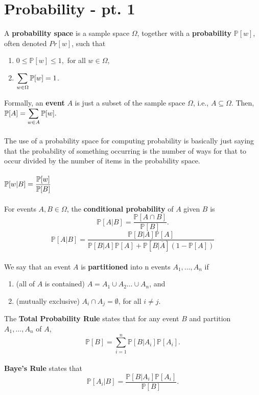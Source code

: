 \documentclass{article}
\theoremstyle{definition}
\begin{document}
\section*{Probability - pt. 1}
A \textbf{probability space} is a sample space $\Omega$, together with a \textbf{probability} $\mathbb{P}[w]$, often denoted $Pr[w]$, such that \begin{enumerate} \item $0 \leq \mathbb{P}[w] \leq 1,$ for all $w \in \Omega$,
\item $\mathlarger{\sum_{w \in \Omega} \mathbb{P}[w]} = 1$.
\end{enumerate} $ $ \\
Formally, an \textbf{event} $A$ is just a subset of the sample space $\Omega$, i.e., $A \subseteq \Omega$. Then, $\mathbb{P}[A] = \mathlarger{\sum_{w \in A}\mathbb{P}[w]}.$ \\ \\
The use of a probability space for computing probability is basically just saying that the probability of something occurring is the number of ways for that to occur divided by the number of items in the probability space. \\ \\
$\mathbb{P}[w | B] = \mathlarger{\frac{\mathbb{P}[w]}{\mathbb{P}[B]}}$ \\ \\
For events $A, B \in \Omega$, the \textbf{conditional probability} of $A$ given $B$ is $$\mathbb{P}[A | B] = \frac{\mathbb{P}[A \cap B]}{\mathbb{P}[B]}.$$
$$\mathbb{P}[A | B] = \frac{\mathbb{P}[B | A]\mathbb{P}[A]}{\mathbb{P}[B | A]\mathbb{P}[A] + \mathbb{P}[B | \overline{A}](1 - \mathbb{P}[A])}$$ \\
We say that an event $A$ is \textbf{partitioned} into n events $A_1, \dots, A_n$ if \begin{enumerate} \item (all of $A$ is contained) $A = A_1 \cup A_2 \dots \cup A_n$, and 
\item (mutually exclusive) $A_i \cap A_j = \emptyset$, for all $i \neq j.$
\end{enumerate} $ $ \\
The \textbf{Total Probability Rule} states that for any event $B$ and partition $A_1, \dots, A_n$ of $A$, $$\mathbb{P}[B] = \sum_{i = 1}^n \mathbb{P}[B | A_i] \mathbb{P}[A_i].$$ \\
\textbf{Baye's Rule} states that $$\mathbb{P}[A_i | B] = \frac{\mathbb{P}[B | A_i] \mathbb{P}[A_i]}{\mathbb{P}[B]}.$$ \\
\end{document}
